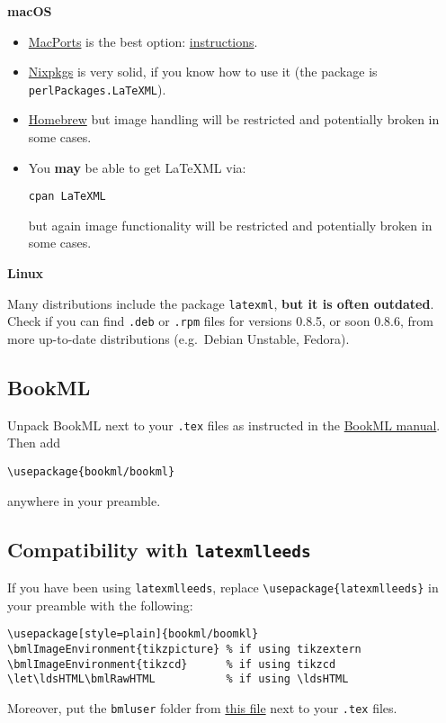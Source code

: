 \documentclass[a4paper]{article}
\let\ldsHTML\bmlRawHTML
\def\ltxinline{\lstinline[style=latexml,frame=none]}
\theoremstyle{definition}
\begin{document}
\begin{h:details}
  \begin{h:summary}\textbf{macOS}\end{h:summary}
  \begin{itemize}
    \item \href{https://www.macports.org/}{MacPorts} is the best option: \href{https://dlmf.nist.gov/LaTeXML/get.html}{instructions}.
    \item \href{https://nixos.wiki/wiki/Nixpkgs}{Nixpkgs} is very solid, if you know how to use it (the package is \texttt{perlPackages.LaTeXML}).
    \item \href{https://brew.sh/}{Homebrew} but image handling will be restricted and potentially broken in some cases.
    \item You \textbf{may} be able to get LaTeXML via:
      \begin{lstlisting}
cpan LaTeXML
      \end{lstlisting}
      but again image functionality will be restricted and potentially broken in some cases.
  \end{itemize}
\end{h:details}

\begin{h:details}
  \begin{h:summary}\textbf{Linux}\end{h:summary}
  Many distributions include the package \texttt{latexml}, \textbf{but it is often outdated}. Check if you can find \texttt{.deb} or \texttt{.rpm} files for versions 0.8.5, or soon 0.8.6, from more up-to-date distributions (e.g.\ Debian Unstable, Fedora).
\end{h:details}

\subsection{BookML}
Unpack BookML next to your \texttt{.tex} files as instructed in the \href{https://vlmantova.github.io/bookml/}{BookML manual}. Then add
\begin{lstlisting}[style=latexml]
\usepackage{bookml/bookml}
\end{lstlisting}
anywhere in your preamble.

\subsection{Compatibility with \texttt{latexmlleeds}}
\label{sub:comp-latexmlleeds}
If you have been using \texttt{latexmlleeds}, replace \ltxinline|\usepackage{latexmlleeds}| in your preamble with the following:
\begin{lstlisting}[style=latexml]
\usepackage[style=plain]{bookml/boomkl}
\bmlImageEnvironment{tikzpicture} % if using tikzextern
\bmlImageEnvironment{tikzcd}      % if using tikzcd
\let\ldsHTML\bmlRawHTML           % if using \ldsHTML
\end{lstlisting}
Moreover, put the \texttt{bmluser} folder from \href{https://minerva.leeds.ac.uk/bbcswebdav/courses/201920_MAPS_MM8863/latexmlleeds/bmluser-latexmlleeds.zip}{this file} next to your \texttt{.tex} files.
\end{document}
